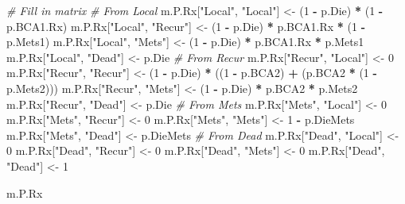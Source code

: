 \documentclass[]{article}
\newenvironment{Shaded}{\begin{snugshade}}{\end{snugshade}}
\newcommand{\DecValTok}[1]{\textcolor[rgb]{0.00,0.00,0.81}{#1}}
\newcommand{\StringTok}[1]{\textcolor[rgb]{0.31,0.60,0.02}{#1}}
\newcommand{\CommentTok}[1]{\textcolor[rgb]{0.56,0.35,0.01}{\textit{#1}}}
\newcommand{\OperatorTok}[1]{\textcolor[rgb]{0.81,0.36,0.00}{\textbf{#1}}}
\newcommand{\NormalTok}[1]{#1}
\theoremstyle{definition}
\theoremstyle{definition}
\theoremstyle{definition}
\theoremstyle{remark}
\begin{document}
\begin{Shaded}
\begin{Highlighting}[]
\CommentTok{# Fill in matrix}
\CommentTok{# From Local}
\NormalTok{m.P.Rx[}\StringTok{"Local"}\NormalTok{, }\StringTok{"Local"}\NormalTok{] <-}\StringTok{ }\NormalTok{(}\DecValTok{1} \OperatorTok{-}\StringTok{ }\NormalTok{p.Die) }\OperatorTok{*}\StringTok{ }\NormalTok{(}\DecValTok{1} \OperatorTok{-}\StringTok{ }\NormalTok{p.BCA1.Rx)}
\NormalTok{m.P.Rx[}\StringTok{"Local"}\NormalTok{, }\StringTok{"Recur"}\NormalTok{] <-}\StringTok{ }\NormalTok{(}\DecValTok{1} \OperatorTok{-}\StringTok{ }\NormalTok{p.Die) }\OperatorTok{*}\StringTok{ }\NormalTok{p.BCA1.Rx }\OperatorTok{*}\StringTok{ }\NormalTok{(}\DecValTok{1} \OperatorTok{-}\StringTok{ }\NormalTok{p.Mets1) }
\NormalTok{m.P.Rx[}\StringTok{"Local"}\NormalTok{, }\StringTok{"Mets"}\NormalTok{]  <-}\StringTok{ }\NormalTok{(}\DecValTok{1} \OperatorTok{-}\StringTok{ }\NormalTok{p.Die) }\OperatorTok{*}\StringTok{ }\NormalTok{p.BCA1.Rx }\OperatorTok{*}\StringTok{ }\NormalTok{p.Mets1}
\NormalTok{m.P.Rx[}\StringTok{"Local"}\NormalTok{, }\StringTok{"Dead"}\NormalTok{]  <-}\StringTok{ }\NormalTok{p.Die}
\CommentTok{# From Recur}
\NormalTok{m.P.Rx[}\StringTok{"Recur"}\NormalTok{, }\StringTok{"Local"}\NormalTok{] <-}\StringTok{ }\DecValTok{0}
\NormalTok{m.P.Rx[}\StringTok{"Recur"}\NormalTok{, }\StringTok{"Recur"}\NormalTok{] <-}\StringTok{ }\NormalTok{(}\DecValTok{1} \OperatorTok{-}\StringTok{ }\NormalTok{p.Die) }\OperatorTok{*}\StringTok{ }\NormalTok{((}\DecValTok{1} \OperatorTok{-}\StringTok{ }\NormalTok{p.BCA2) }\OperatorTok{+}\StringTok{ }\NormalTok{(p.BCA2 }\OperatorTok{*}\StringTok{ }\NormalTok{(}\DecValTok{1} \OperatorTok{-}\StringTok{ }\NormalTok{p.Mets2)))}
\NormalTok{m.P.Rx[}\StringTok{"Recur"}\NormalTok{, }\StringTok{"Mets"}\NormalTok{]  <-}\StringTok{ }\NormalTok{(}\DecValTok{1} \OperatorTok{-}\StringTok{ }\NormalTok{p.Die) }\OperatorTok{*}\StringTok{ }\NormalTok{p.BCA2 }\OperatorTok{*}\StringTok{ }\NormalTok{p.Mets2}
\NormalTok{m.P.Rx[}\StringTok{"Recur"}\NormalTok{, }\StringTok{"Dead"}\NormalTok{]  <-}\StringTok{ }\NormalTok{p.Die}
\CommentTok{# From Mets}
\NormalTok{m.P.Rx[}\StringTok{"Mets"}\NormalTok{, }\StringTok{"Local"}\NormalTok{]  <-}\StringTok{ }\DecValTok{0}
\NormalTok{m.P.Rx[}\StringTok{"Mets"}\NormalTok{, }\StringTok{"Recur"}\NormalTok{]  <-}\StringTok{ }\DecValTok{0}
\NormalTok{m.P.Rx[}\StringTok{"Mets"}\NormalTok{, }\StringTok{"Mets"}\NormalTok{]   <-}\StringTok{ }\DecValTok{1} \OperatorTok{-}\StringTok{ }\NormalTok{p.DieMets}
\NormalTok{m.P.Rx[}\StringTok{"Mets"}\NormalTok{, }\StringTok{"Dead"}\NormalTok{]   <-}\StringTok{ }\NormalTok{p.DieMets}
\CommentTok{# From Dead}
\NormalTok{m.P.Rx[}\StringTok{"Dead"}\NormalTok{, }\StringTok{"Local"}\NormalTok{]  <-}\StringTok{ }\DecValTok{0}
\NormalTok{m.P.Rx[}\StringTok{"Dead"}\NormalTok{, }\StringTok{"Recur"}\NormalTok{]  <-}\StringTok{ }\DecValTok{0}
\NormalTok{m.P.Rx[}\StringTok{"Dead"}\NormalTok{, }\StringTok{"Mets"}\NormalTok{]   <-}\StringTok{ }\DecValTok{0}
\NormalTok{m.P.Rx[}\StringTok{"Dead"}\NormalTok{, }\StringTok{"Dead"}\NormalTok{]   <-}\StringTok{ }\DecValTok{1}

\NormalTok{m.P.Rx}
\end{Highlighting}
\end{Shaded}
\end{document}
